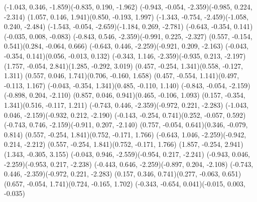 \pstThreeDLine[linecolor=gray](-1.043, 0.346, -1.859)(-0.835, 0.190, -1.962)
\pstThreeDLine[linecolor=gray](-0.943, -0.054, -2.359)(-0.985, 0.224, -2.314)
\pstThreeDLine[linecolor=gray](1.057, 0.146, 1.941)(0.850, -0.193, 1.997)
\pstThreeDLine[linecolor=gray](-1.343, -0.754, -2.459)(-1.058, 0.240, -2.484)
\pstThreeDLine[linecolor=gray](-1.543, -0.054, -2.659)(-1.184, 0.269, -2.781)
\pstThreeDLine[linecolor=gray](-0.643, -0.354, 0.141)(-0.035, 0.008, -0.083)
\pstThreeDLine[linecolor=gray](-0.843, 0.546, -2.359)(-0.991, 0.225, -2.327)
\pstThreeDLine[linecolor=gray](0.557, -0.154, 0.541)(0.284, -0.064, 0.666)
\pstThreeDLine[linecolor=gray](-0.643, 0.446, -2.259)(-0.921, 0.209, -2.163)
\pstThreeDLine[linecolor=gray](-0.043, -0.354, 0.141)(0.056, -0.013, 0.132)
\pstThreeDLine[linecolor=gray](-0.343, 1.146, -2.359)(-0.935, 0.213, -2.197)
\pstThreeDLine[linecolor=gray](1.757, -0.054, 2.841)(1.285, -0.292, 3.019)
\pstThreeDLine[linecolor=gray](0.457, -0.254, 1.341)(0.558, -0.127, 1.311)
\pstThreeDLine[linecolor=gray](0.557, 0.046, 1.741)(0.706, -0.160, 1.658)
\pstThreeDLine[linecolor=gray](0.457, -0.554, 1.141)(0.497, -0.113, 1.167)
\pstThreeDLine[linecolor=gray](-0.043, -0.354, 1.341)(0.485, -0.110, 1.140)
\pstThreeDLine[linecolor=gray](-0.843, -0.054, -2.159)(-0.898, 0.204, -2.110)
\pstThreeDLine[linecolor=gray](0.857, 0.046, 0.941)(0.465, -0.106, 1.093)
\pstThreeDLine[linecolor=gray](0.157, -0.354, 1.341)(0.516, -0.117, 1.211)
\pstThreeDLine[linecolor=gray](-0.743, 0.446, -2.359)(-0.972, 0.221, -2.283)
\pstThreeDLine[linecolor=gray](-1.043, 0.046, -2.159)(-0.932, 0.212, -2.190)
\pstThreeDLine[linecolor=gray](-0.143, -0.254, 0.741)(0.252, -0.057, 0.592)
\pstThreeDLine[linecolor=gray](-0.743, 0.746, -2.159)(-0.911, 0.207, -2.140)
\pstThreeDLine[linecolor=gray](0.757, -0.054, 0.641)(0.346, -0.079, 0.814)
\pstThreeDLine[linecolor=gray](0.557, -0.254, 1.841)(0.752, -0.171, 1.766)
\pstThreeDLine[linecolor=gray](-0.643, 1.046, -2.259)(-0.942, 0.214, -2.212)
\pstThreeDLine[linecolor=gray](0.557, -0.254, 1.841)(0.752, -0.171, 1.766)
\pstThreeDLine[linecolor=gray](1.857, -0.254, 2.941)(1.343, -0.305, 3.155)
\pstThreeDLine[linecolor=gray](-0.043, 0.946, -2.559)(-0.954, 0.217, -2.241)
\pstThreeDLine[linecolor=gray](-0.943, 0.046, -2.259)(-0.953, 0.217, -2.238)
\pstThreeDLine[linecolor=gray](-0.443, 0.646, -2.259)(-0.897, 0.204, -2.108)
\pstThreeDLine[linecolor=gray](-0.743, 0.446, -2.359)(-0.972, 0.221, -2.283)
\pstThreeDLine[linecolor=gray](0.157, 0.346, 0.741)(0.277, -0.063, 0.651)
\pstThreeDLine[linecolor=gray](0.657, -0.054, 1.741)(0.724, -0.165, 1.702)
\pstThreeDLine[linecolor=gray](-0.343, -0.654, 0.041)(-0.015, 0.003, -0.035)
